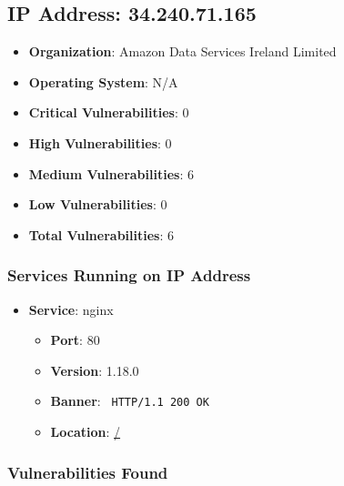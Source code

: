 \documentclass{article}
\begin{document}
\subsection*{IP Address: 34.240.71.165}

\begin{itemize}
    \item \textbf{Organization}: Amazon Data Services Ireland Limited
    \item \textbf{Operating System}:  N/A 
    \item \textbf{Critical Vulnerabilities}: 0
    \item \textbf{High Vulnerabilities}: 0
    \item \textbf{Medium Vulnerabilities}: 6
    \item \textbf{Low Vulnerabilities}: 0
    \item \textbf{Total Vulnerabilities}: 6
\end{itemize}

\subsubsection*{Services Running on IP Address}

\begin{itemize}
    
        \item \textbf{Service}: nginx
        \begin{itemize}
            \item \textbf{Port}: 80
            \item \textbf{Version}:  1.18.0 
            \item \textbf{Banner}: \texttt{
                HTTP/1.1 200 OK
            }
            \item \textbf{Location}: \href{ / }{ / }
        \end{itemize}
    
\end{itemize}


\subsubsection*{Vulnerabilities Found}
\end{document}
